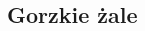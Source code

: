 \documentclass[wide,landscape,a4paper,10pt]{mwart}
\begin{document}
\footnotesize 
\pagestyle{empty}
\begin{multicols}{4}
	
\section{Gorzkie żale}







\end{multicols}
\end{document}
